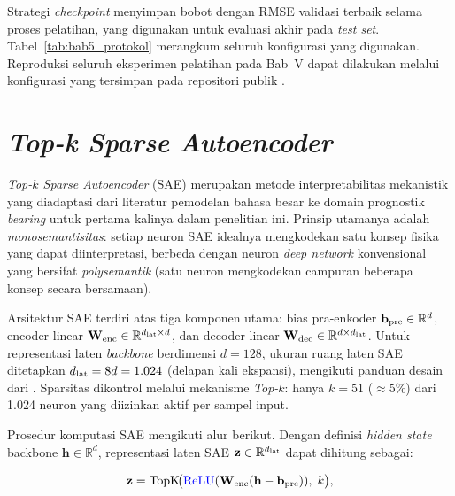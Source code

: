 Strategi \emph{checkpoint} menyimpan bobot dengan RMSE validasi terbaik
selama proses pelatihan, yang digunakan untuk evaluasi akhir pada
\emph{test set}.
Tabel~\ref{tab:bab5_protokol} merangkum seluruh konfigurasi yang digunakan.
Reproduksi seluruh eksperimen pelatihan pada Bab~V dapat dilakukan melalui
konfigurasi yang tersimpan pada repositori publik .

\section{\emph{Top-k Sparse Autoencoder}}
\label{sec:bab5_sae}

\emph{Top-$k$ Sparse Autoencoder} (SAE) merupakan metode interpretabilitas
mekanistik yang diadaptasi dari literatur pemodelan bahasa besar
{\color{blue}}
ke domain prognostik \emph{bearing} untuk pertama kalinya dalam penelitian ini.
Prinsip utamanya adalah \emph{monosemantisitas}: setiap neuron SAE idealnya
mengkodekan satu konsep fisika yang dapat diinterpretasi, berbeda dengan
neuron \emph{deep network} konvensional yang bersifat \emph{polysemantik} (satu
neuron mengkodekan campuran beberapa konsep secara bersamaan).

Arsitektur SAE terdiri atas tiga komponen utama: bias pra-enkoder
$\mathbf{b}_{\rm pre} \in \mathbb{R}^d$, encoder linear $\mathbf{W}_{\rm enc}
\in \mathbb{R}^{d_{\rm lat} \times d}$, dan decoder linear
$\mathbf{W}_{\rm dec} \in \mathbb{R}^{d \times d_{\rm lat}}$.
Untuk representasi laten \emph{backbone} berdimensi $d = 128$, ukuran
ruang laten SAE ditetapkan $d_{\rm lat} = 8d = 1.024$ (delapan kali
ekspansi), mengikuti panduan desain dari .
Sparsitas dikontrol melalui mekanisme \emph{Top-$k$}: hanya $k = 51$
($\approx 5\%$) dari 1.024 neuron yang diizinkan aktif per sampel input.

Prosedur komputasi SAE mengikuti alur berikut.
Dengan definisi \emph{hidden state} backbone $\mathbf{h} \in \mathbb{R}^d$,
representasi laten SAE $\mathbf{z} \in \mathbb{R}^{d_{\rm lat}}$ dapat dihitung
sebagai:

\begin{equation}\label{eq:bab5_sae_topk}
  \mathbf{z} = \mathrm{TopK}\!\bigl({\color{blue}\mathrm{ReLU}}(\mathbf{W}_{\rm enc}
                (\mathbf{h} - \mathbf{b}_{\rm pre})),\; k\bigr),
\end{equation}

